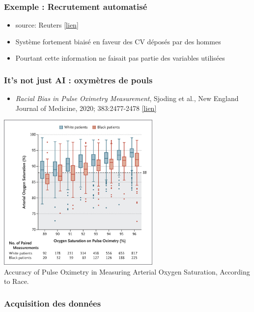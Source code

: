 \documentclass[sans,14pt]{beamer}
\begin{document}
{\begin{frame}[t]
  \frametitle{Exemple : Recrutement automatisé}
  \begin{itemize}
  \item[] {\footnotesize \hfill source: Reuters [\href{https://www.reuters.com/article/us-amazon-com-jobs-automation-insight-idUSKCN1MK08G}{lien}]}
  \item Système fortement biaisé en faveur des CV déposés par des hommes
  \item Pourtant cette information ne faisait pas partie des variables utilisées
    \vfill
  \end{itemize}
\end{frame}


\begin{frame}
  \frametitle{It's not just AI : oxymètres de pouls}
  \begin{itemize}
  \item {\textit{Racial Bias in Pulse Oximetry Measurement}}, Sjoding et al., New
    England Journal of Medicine, 2020; 383:2477-2478 \href{https://www.nejm.org/doi/full/10.1056/NEJMc2029240}{[lien]}
  \end{itemize}
  \begin{center}
    \includegraphics[width=0.6\textwidth]{figures/nejmc_sjoding2020} \\
    \footnotesize Accuracy of Pulse Oximetry in Measuring Arterial Oxygen
    Saturation, According to Race.
  \end{center}
\end{frame}

\begin{frame}
  \frametitle{Acquisition des données}
\end{frame}



}
\end{document}
